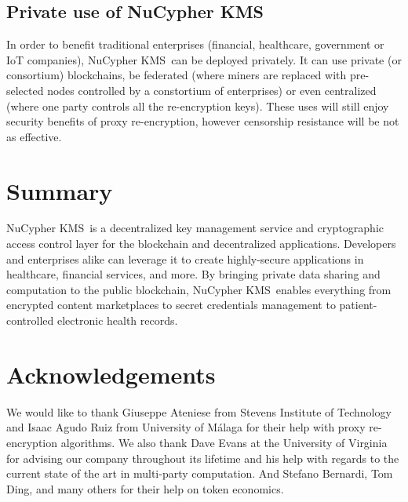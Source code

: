 \documentclass[longbibliography,nofootinbib]{revtex4-1}
\newcommand{\kms}{NuCypher KMS}
\begin{document}
\subsection{Private use of \kms}
In order to benefit traditional enterprises (financial, healthcare, government or IoT companies), \kms~can be deployed privately.
It can use private (or consortium) blockchains,
be federated (where miners are replaced with pre-selected nodes controlled by a constortium of enterprises)
or even centralized (where one party controls all the re-encryption keys).
These uses will still enjoy security benefits of proxy re-encryption, however censorship resistance will be not as effective.

\section{Summary}
\kms~is a decentralized key management service and cryptographic access control layer for the blockchain and
decentralized applications.
Developers and enterprises alike can leverage it to create highly-secure applications in healthcare,
financial services, and more.
By bringing private data sharing and computation to the public blockchain, \kms~enables everything from encrypted
content marketplaces to secret credentials management to patient-controlled electronic health records.

\section{Acknowledgements}
We would like to thank Giuseppe Ateniese from Stevens Institute of Technology and Isaac Agudo Ruiz from University of M{\'a}laga
for their help with proxy re-encryption algorithms.
We also thank Dave Evans at the University of Virginia for advising our company throughout its lifetime
and his help with regards to the current state of the art in multi-party computation.
And Stefano Bernardi, Tom Ding, and many others for their help on token economics.


\end{document}
